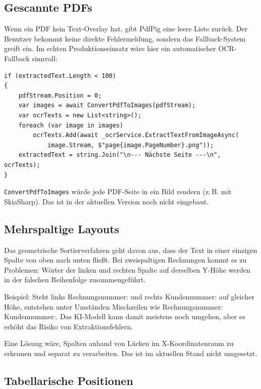\subsection{Gescannte PDFs}

Wenn ein PDF kein Text-Overlay hat, gibt PdfPig eine leere Liste zurück. Der Benutzer bekommt keine direkte Fehlermeldung, sondern das Fallback-System greift ein. Im echten Produktionseinsatz wäre hier ein automatischer OCR-Fallback sinnvoll:

\begin{lstlisting}[language={[Sharp]C}, caption={OCR-Fallback für gescannte PDFs (Konzept)}, label={lst:ocr_fallback}]
if (extractedText.Length < 100)
{
    pdfStream.Position = 0;
    var images = await ConvertPdfToImages(pdfStream);
    var ocrTexts = new List<string>();
    foreach (var image in images)
        ocrTexts.Add(await _ocrService.ExtractTextFromImageAsync(
            image.Stream, $"page{image.PageNumber}.png"));
    extractedText = string.Join("\n--- Nächste Seite ---\n", ocrTexts);
}
\end{lstlisting}

\texttt{ConvertPdfToImages} würde jede PDF-Seite in ein Bild rendern (z.\,B. mit SkiaSharp). Das ist in der aktuellen Version noch nicht eingebaut.

\subsection{Mehrspaltige Layouts}

Das geometrische Sortierverfahren geht davon aus, dass der Text in einer einzigen Spalte von oben nach unten fließt. Bei zweispaltigen Rechnungen kommt es zu Problemen: Wörter der linken und rechten Spalte auf derselben Y-Höhe werden in der falschen Reihenfolge zusammengeführt.

Beispiel: Steht links \glqq Rechnungsnummer:\grqq{} und rechts \glqq Kundennummer:\grqq{} auf gleicher Höhe, entstehen unter Umständen Mischzeilen wie \glqq Rechnungsnummer: Kundennummer:\grqq. Das KI-Modell kann damit meistens noch umgehen, aber es erhöht das Risiko von Extraktionsfehlern.

Eine Lösung wäre, Spalten anhand von Lücken im X-Koordinatenraum zu erkennen und separat zu verarbeiten. Das ist im aktuellen Stand nicht umgesetzt.

\subsection{Tabellarische Positionen}

